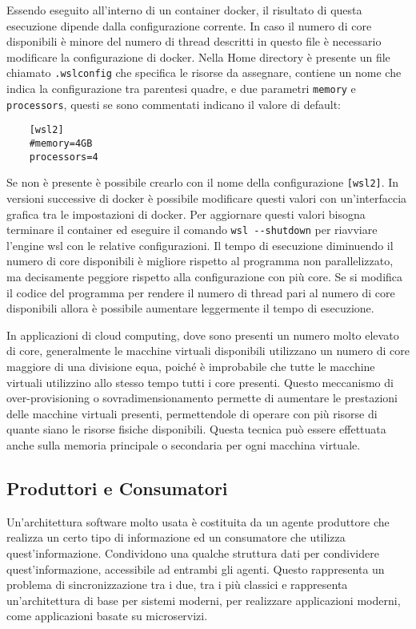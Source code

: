 \documentclass{article}
\numberwithin{equation}{subsection}
\begin{document}
Essendo eseguito all'interno di un container docker, il risultato di questa esecuzione dipende dalla configurazione corrente. In caso il numero di core disponibili è minore del numero di thread descritti in questo file è necessario modificare la configurazione di docker. 
Nella Home directory è presente un file chiamato \verb|.wslconfig| che specifica le risorse da assegnare, contiene un nome che indica la configurazione tra 
parentesi quadre, e due parametri \verb|memory| e \verb|processors|, questi se sono commentati indicano il valore di default:
\begin{verbatim}
    [wsl2]
    #memory=4GB
    processors=4
\end{verbatim}
Se non è presente è possibile 
crearlo con il nome della configurazione \verb|[wsl2]|. In versioni successive di docker è possibile modificare questi valori con un'interfaccia grafica 
tra le impostazioni di docker. 
Per aggiornare questi valori bisogna terminare il container ed eseguire il comando \verb|wsl --shutdown| per riavviare l'engine wsl con le relative configurazioni. 
Il tempo di esecuzione diminuendo il numero di core disponibili è migliore rispetto al programma non parallelizzato, ma decisamente peggiore rispetto alla configurazione 
con più core. Se si modifica il codice del programma per rendere il numero di thread pari al numero di core disponibili allora è possibile aumentare leggermente il 
tempo di esecuzione. 

In applicazioni di cloud computing, dove sono presenti un numero molto elevato di core, generalmente le macchine virtuali disponibili utilizzano un numero di core maggiore 
di una divisione equa, poiché è improbabile che tutte le macchine virtuali utilizzino allo stesso tempo tutti i core presenti. Questo meccanismo di over-provisioning o sovradimensionamento permette di aumentare le prestazioni delle macchine virtuali 
presenti, permettendole di operare con più risorse di quante siano le risorse fisiche 
disponibili. Questa tecnica può essere effettuata anche sulla memoria principale o 
secondaria per ogni macchina virtuale. 

\subsection{Produttori e Consumatori}

Un'architettura software molto usata è costituita da un agente produttore che realizza un certo tipo di informazione ed un consumatore che utilizza quest'informazione. 
Condividono una qualche struttura dati per condividere quest'informazione, accessibile ad entrambi gli agenti. Questo rappresenta un problema di sincronizzazione tra i due, tra i più classici e rappresenta un'architettura di base per sistemi moderni, per 
realizzare applicazioni moderni, come applicazioni basate su microservizi. 
\end{document}
